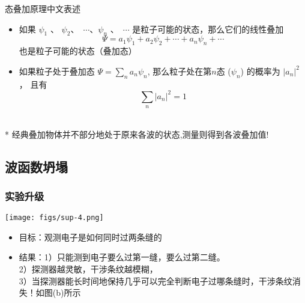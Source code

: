 \begin{frame}
     \frametitle{}
     \begin{atcbox}{态叠加原理中文表述}
        \begin{itemize}
            \item 如果 $\psi_1$ 、 $\psi_2$、 $\cdots$、$\psi_n$ 、 $\cdots$ 是粒子可能的状态，那么它们的线性叠加
            $$ \Psi=a_1 \psi_1+ a_2\psi_2+\cdots+a_n\psi_n + \cdots $$
        也是粒子可能的状态（叠加态）\\
            \item 如果粒子处于叠加态 $\Psi=\sum\limits_{n} a_n \psi_n$,  
        那么粒子处在第$n$态 ($\psi_n$) 的概率为 $|a_n |^2$， 
        且有  $$\sum_{n} |a_n|^2 =1$$
        \end{itemize}
     \end{atcbox}
     ~~\\ 
     * 经典叠加物体并不部分地处于原来各波的状态,测量则得到各波叠加值!
 \end{frame}
 
 \subsection{波函数坍塌}
 
 \begin{frame}
     \frametitle{实验升级}
     \begin{center}
         \texttt{[image: figs/sup-4.png]} \\
     \end{center} 
     \begin{itemize}
          \item 目标：观测电子是如何同时过两条缝的
          \item 结果：1）只能测到电子要么过第一缝，要么过第二缝。\\
         2）探测器越灵敏，干涉条纹越模糊，\\
         3）当探测器能长时间地保持几乎可以完全判断电子过哪条缝时，干涉条纹消失！如图(b)所示
     \end{itemize}
 \end{frame}
 
